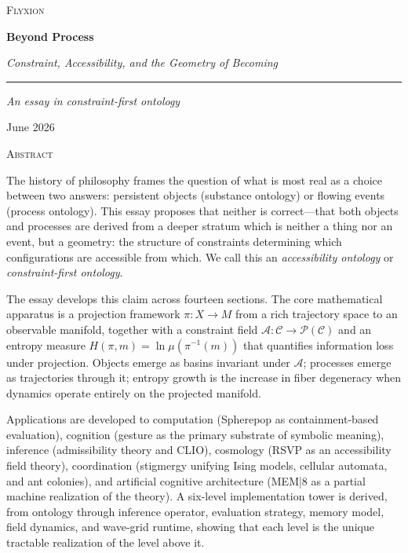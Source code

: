 \documentclass[12pt, a4paper, twoside]{article}
\theoremstyle{plain}
\theoremstyle{definition}
\theoremstyle{remark}
\begin{document}
\begin{titlepage}
  \centering
  \vspace*{3cm}
  {\Large\scshape Flyxion \par}
  \vspace{2cm}
  {\Huge\bfseries Beyond Process\par}
  \vspace{0.8cm}
  {\Large\itshape Constraint, Accessibility, and the Geometry of Becoming\par}
  \vspace{2cm}
  \rule{0.4\textwidth}{0.5pt}\par
  \vspace{0.8cm}
  {\large\itshape An essay in constraint-first ontology\par}
  \vfill
  {\normalsize June 2026\par}
\end{titlepage}

\newpage
\thispagestyle{empty}

\vspace*{1.5cm}
\begin{center}
  {\large\scshape Abstract}
\end{center}
\vspace{0.8em}

\noindent
The history of philosophy frames the question of what is most real as a choice
between two answers: persistent objects (substance ontology) or flowing events
(process ontology). This essay proposes that neither is correct---that both
objects and processes are derived from a deeper stratum which is neither a
thing nor an event, but a geometry: the structure of constraints determining
which configurations are accessible from which. We call this an
\emph{accessibility ontology} or \emph{constraint-first ontology}.

The essay develops this claim across fourteen sections. The core mathematical
apparatus is a projection framework $\pi: X \to M$ from a rich trajectory
space to an observable manifold, together with a constraint field
$\mathcal{A}: \mathcal{C} \to \mathcal{P}(\mathcal{C})$ and an entropy
measure $H(\pi, m) = \ln\mu(\pi^{-1}(m))$ that quantifies information loss
under projection. Objects emerge as basins invariant under $\mathcal{A}$;
processes emerge as trajectories through it; entropy growth is the increase
in fiber degeneracy when dynamics operate entirely on the projected manifold.

Applications are developed to computation (Spherepop as containment-based
evaluation), cognition (gesture as the primary substrate of symbolic meaning),
inference (admissibility theory and CLIO), cosmology (RSVP as an accessibility
field theory), coordination (stigmergy unifying Ising models, cellular automata,
and ant colonies), and artificial cognitive architecture (MEM|8 as a partial
machine realization of the theory). A six-level implementation tower is
derived, from ontology through inference operator, evaluation strategy, memory
model, field dynamics, and wave-grid runtime, showing that each level is the
unique tractable realization of the level above it.
\end{document}

